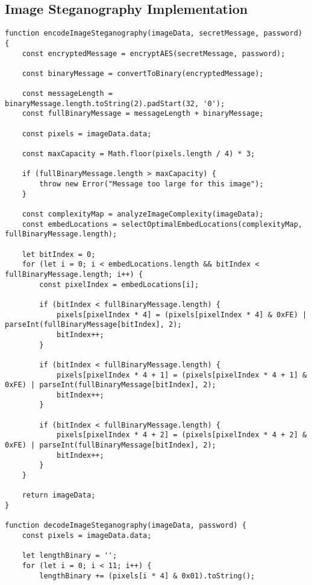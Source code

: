 \documentclass[12pt, a4paper, oneside]{book}
\begin{document}
\subsection*{Image Steganography Implementation}

\begin{verbatim}
function encodeImageSteganography(imageData, secretMessage, password) {
    const encryptedMessage = encryptAES(secretMessage, password);

    const binaryMessage = convertToBinary(encryptedMessage);

    const messageLength = binaryMessage.length.toString(2).padStart(32, '0');
    const fullBinaryMessage = messageLength + binaryMessage;

    const pixels = imageData.data;

    const maxCapacity = Math.floor(pixels.length / 4) * 3;

    if (fullBinaryMessage.length > maxCapacity) {
        throw new Error("Message too large for this image");
    }

    const complexityMap = analyzeImageComplexity(imageData);
    const embedLocations = selectOptimalEmbedLocations(complexityMap, fullBinaryMessage.length);

    let bitIndex = 0;
    for (let i = 0; i < embedLocations.length && bitIndex < fullBinaryMessage.length; i++) {
        const pixelIndex = embedLocations[i];

        if (bitIndex < fullBinaryMessage.length) {
            pixels[pixelIndex * 4] = (pixels[pixelIndex * 4] & 0xFE) | parseInt(fullBinaryMessage[bitIndex], 2);
            bitIndex++;
        }

        if (bitIndex < fullBinaryMessage.length) {
            pixels[pixelIndex * 4 + 1] = (pixels[pixelIndex * 4 + 1] & 0xFE) | parseInt(fullBinaryMessage[bitIndex], 2);
            bitIndex++;
        }

        if (bitIndex < fullBinaryMessage.length) {
            pixels[pixelIndex * 4 + 2] = (pixels[pixelIndex * 4 + 2] & 0xFE) | parseInt(fullBinaryMessage[bitIndex], 2);
            bitIndex++;
        }
    }

    return imageData;
}

function decodeImageSteganography(imageData, password) {
    const pixels = imageData.data;

    let lengthBinary = '';
    for (let i = 0; i < 11; i++) {
        lengthBinary += (pixels[i * 4] & 0x01).toString();


\end{verbatim}
\end{document}

